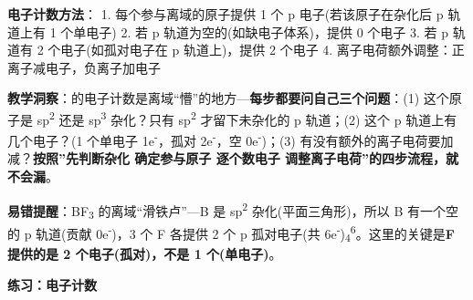\textbf{电子计数方法}：
1. 每个参与离域的原子提供 1 个 p 电子(若该原子在杂化后 p 轨道上有 1 个单电子)
2. 若 p 轨道为空的(如缺电子体系)，提供 0 个电子
3. 若 p 轨道有 2 个电子(如孤对电子在 p 轨道上)，提供 2 个电子
4. 离子电荷额外调整：正离子减电子，负离子加电子

\textbf{教学洞察}： 的电子计数是离域``懵''的地方---\textbf{每步都要问自己三个问题}：(1) 这个原子是 sp\textsuperscript{2} 还是 sp\textsuperscript{3} 杂化？只有 sp\textsuperscript{2} 才留下未杂化的 p 轨道；(2) 这个 p 轨道上有几个电子？(1 个单电子 \箭 1e\textsuperscript{-}，孤对 \箭 2e\textsuperscript{-}，空 \箭 0e\textsuperscript{-})；(3) 有没有额外的离子电荷要加减？\textbf{按照''先判断杂化 \箭 确定参与原子 \箭 逐个数电子 \箭 调整离子电荷''的四步流程，就不会漏}。

\textbf{易错提醒}：BF\textsubscript{3} 的离域``滑铁卢''---B 是 sp\textsuperscript{2} 杂化(平面三角形)，所以 B 有一个空的 p 轨道(贡献 0e\textsuperscript{-})，3 个 F 各提供 2 个 p 孤对电子(共 6e\textsuperscript{-})\箭 \派\textsubscript{4}\textsuperscript{6}。这里的关键是\textbf{F 提供的是 2 个电子(孤对)，不是 1 个(单电子)}。

\textbf{练习： 电子计数}

